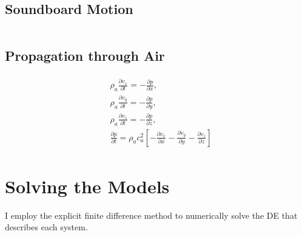 \documentclass[a4paper,12pt]{article}
\begin{document}
\subsection*{Soundboard Motion}
	\[ \]

\subsection*{Propagation through Air}
		\begin{multline}
		\begin{aligned}
			&\rho_a \frac{\partial v_x}{\partial t} = -\frac{\partial p}{\partial x},\\
			&\rho_a \frac{\partial v_y}{\partial t} = -\frac{\partial p}{\partial y},\\
			&\rho_a \frac{\partial v_z}{\partial t} = -\frac{\partial p}{\partial z}	,\\
			&\frac{\partial p}{\partial t} = 
				\rho_a c_a^2 [-\frac{\partial v_x}{\partial x}
				              -\frac{\partial v_y}{\partial y}
				              -\frac{\partial v_z}{\partial z}]
		\end{aligned}
		\end{multline}


\section*{Solving the Models}
		I employ the explicit finite difference method to numerically solve the DE that describes each system.
\end{document}
